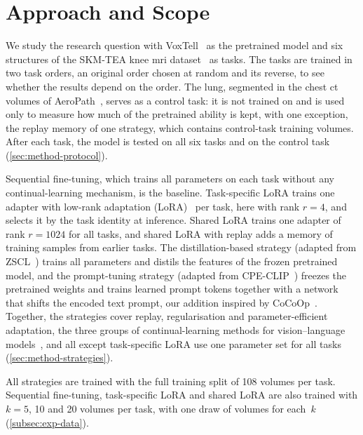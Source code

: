 \section{Approach and Scope}
\label{sec:intro-approach}

We study the research question with VoxTell~\cite{rokuss2025voxtellfreetextpromptableuniversal} as the pretrained model and six structures of the SKM-TEA knee \gls{mri} dataset~\cite{desai2021skmtea} as tasks.
The tasks are trained in two task orders, an original order chosen at random and its reverse, to see whether the results depend on the order.
The lung, segmented in the chest \gls{ct} volumes of AeroPath~\cite{støverud2023aeropathairwaysegmentationbenchmark}, serves as a control task: it is not trained on and is used only to measure how much of the pretrained ability is kept, with one exception, the replay memory of one strategy, which contains control-task training volumes.
After each task, the model is tested on all six tasks and on the control task (\cref{sec:method-protocol}).

Sequential fine-tuning, which trains all parameters on each task without any continual-learning mechanism, is the baseline.
Task-specific LoRA trains one adapter with low-rank adaptation (LoRA)~\cite{hu2022lora} per task, here with rank $r = 4$, and selects it by the task identity at inference.
Shared LoRA trains one adapter of rank $r = 1024$ for all tasks, and shared LoRA with replay adds a memory of training samples from earlier tasks.
The distillation-based strategy (adapted from ZSCL~\cite{zheng2023preventingzeroshottransferdegradation}) trains all parameters and distils the features of the frozen pretrained model, and the prompt-tuning strategy (adapted from CPE-CLIP~\cite{D_Alessandro_2023}) freezes the pretrained weights and trains learned prompt tokens together with a network that shifts the encoded text prompt, our addition inspired by CoCoOp~\cite{zhou2022cocoop}.
Together, the strategies cover replay, regularisation and parameter-efficient adaptation, the three groups of continual-learning methods for vision--language models~\cite[Sec.~4]{liu2026continuallearningvlmssurvey}, and all except task-specific LoRA use one parameter set for all tasks (\cref{sec:method-strategies}).

All strategies are trained with the full training split of 108 volumes per task.
Sequential fine-tuning, task-specific LoRA and shared LoRA are also trained with $k = 5$, 10 and 20 volumes per task, with one draw of volumes for each~$k$ (\cref{subsec:exp-data}).

